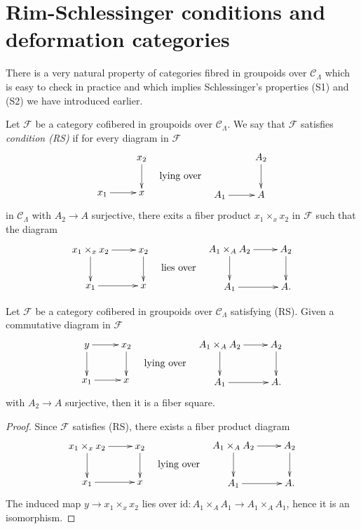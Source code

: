 \section{Rim-Schlessinger conditions and deformation categories}
\label{section-RS-condition}

\noindent
There is a very natural property of categories fibred in groupoids
over $\mathcal{C}_\Lambda$ which is easy to check in practice
and which implies Schlessinger's properties (S1) and (S2) we
have introduced earlier.

\begin{definition}
\label{definition-RS}
Let $\mathcal{F}$ be a category cofibered in groupoids over $\mathcal 
C_\Lambda$.  We say that $\mathcal{F}$ satisfies {\it condition (RS)}
if for every diagram in $\mathcal{F}$
$$
\vcenter{
\xymatrix{
           & x_2 \ar[d] \\
x_1 \ar[r] & x   
}
}
\quad\text{lying over}\quad
\vcenter{
\xymatrix{
           & A_2 \ar[d] \\
A_1 \ar[r] & A   
}
}
$$
in $\mathcal{C}_\Lambda$ with $A_2 \to A$ surjective, there exits a 
fiber product $x_1 \times_{x} x_2$ in $\mathcal{F}$ such that the diagram
$$
\vcenter{
\xymatrix{
x_1 \times_{x} x_2 \ar[r] \ar[d] & x_2 \ar[d] \\
x_1 \ar[r]      & x   
}
}
\quad\text{lies over}\quad
\vcenter{
\xymatrix{
A_1 \times_{A} A_2 \ar[r] \ar[d] & A_2 \ar[d] \\
A_1 \ar[r]      & A.   
}
}
$$
\end{definition}

\begin{lemma}
\label{lemma-RS-fiber-square}
Let $\mathcal{F}$ be a category cofibered in groupoids over
$\mathcal{C}_\Lambda$ satisfying (RS). Given a commutative diagram
in $\mathcal{F}$
$$
\vcenter{
\xymatrix{
y \ar[r] \ar[d] & x_2 \ar[d]   \\
x_1 \ar[r]      & x  
}
}
\quad\text{lying over}\quad
\vcenter{
\xymatrix{
A_1 \times_{A} A_2 \ar[r] \ar[d] & A_2 \ar[d] \\
A_1 \ar[r]      & A.   
}
}
$$
with $A_2 \to A$ surjective, then it is a fiber square.
\end{lemma}

\begin{proof}
Since $\mathcal{F}$ satisfies (RS), there exists a fiber product diagram
$$
\vcenter{
\xymatrix{
x_1 \times_{x} x_2 \ar[r] \ar[d] & x_2 \ar[d] \\
x_1 \ar[r]      & x   
}
}
\quad\text{lying over}\quad
\vcenter{
\xymatrix{
A_1 \times_{A} A_2 \ar[r] \ar[d] & A_2 \ar[d] \\
A_1 \ar[r]      & A.   
}
}
$$
The induced map $y \to x_1 \times_{x} x_2$ lies over
$\text{id} : A_1 \times_{A} A_1 \to A_1 \times_{A} A_1$, hence it is an
isomorphism.
\end{proof}

